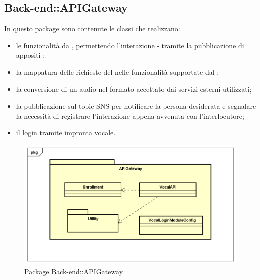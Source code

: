 \subsection{Back-end::APIGateway}
In questo package sono contenute le classi che realizzano:
\begin{itemize}
	\item le funzionalità da , permettendo l'interazione  -  tramite la pubblicazione di appositi ;
	\item la mappatura delle richieste del  nelle funzionalità supportate dal ;
	\item la conversione di un audio nel formato accettato dai servizi esterni utilizzati;
	\item la pubblicazione sul topic SNS per notificare la persona desiderata e segnalare la necessità di registrare l'interazione appena avvenuta con l'interlocutore;
	\item il login tramite impronta vocale.
\end{itemize}
\begin{figure}[h] \centering \includegraphics[width=\textwidth,height=\textheight,keepaspectratio]{images/diagrams/back-end/Official_Backend_0304/APIGateway.png}
	\caption{Package Back-end::APIGateway}
\end{figure}
\newpage



